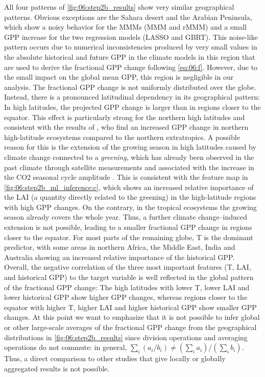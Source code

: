 All four patterns of \cref{fig:06:step2b_results} show very similar
geographical patterns. Obvious exceptions are the Sahara desert and the Arabian
Peninsula, which show a noisy behavior for the \aclp{MMM} (\ac{MMM} and
r\acs{MMM}) and a small \ac{GPP} increase for the two regression models
(\ac{LASSO} and \ac{GBRT}). This noise-like pattern occurs due to numerical
inconsistencies produced by very small values in the absolute historical and
future \ac{GPP} in the climate models in this region that are used to derive
the fractional \ac{GPP} change following \cref{eq:06:f}. However, due to the
small impact on the global mean \ac{GPP}, this region is negligible in our
analysis. The fractional \ac{GPP} change is not uniformly distributed over the
globe. Instead, there is a pronounced latitudinal dependency in its
geographical pattern: In high latitudes, the projected \ac{GPP} change is
larger than in regions closer to the equator. This effect is particularly
strong for the northern high latitudes and consistent with the results of
\textcite{Wenzel2016}, who find an increased \ac{GPP} change in northern
high-latitude ecosystems compared to the northern extratropics. A possible
reason for this is the extension of the growing season in high latitudes caused
by climate change connected to a \emph{greening}, which has already been
observed in the past climate through satellite measurements
\autocite{Lucht2002, Myneni1997, Zhang2020} and associated with the increase in
the \ac{CO2} seasonal cycle amplitude \autocite{Forkel2016}. This is consistent
with the feature map in \cref{fig:06:step2b_ml_inference:c}, which shows an
increased relative importance of the \ac{LAI} (a quantity directly related to
the greening) in the high-latitude regions with high \ac{GPP} changes. On the
contrary, in the tropical ecosystems the growing season already covers the
whole year. Thus, a further climate change--induced extension is not possible,
leading to a smaller fractional \ac{GPP} change in regions closer to the
equator. For most parts of the remaining globe, \ac{T} is the dominant
predictor, with some areas in northern Africa, the Middle East, India and
Australia showing an increased relative importance of the historical \ac{GPP}.
Overall, the negative correlation of the three most important features (\ac{T},
\ac{LAI}, and historical \ac{GPP}) to the target variable is well reflected in
the global pattern of the fractional \ac{GPP} change: The high latitudes with
lower \ac{T}, lower \ac{LAI} and lower historical \ac{GPP} show higher \ac{GPP}
changes, whereas regions closer to the equator with higher \ac{T}, higher
\ac{LAI} and higher historical \ac{GPP} show smaller \ac{GPP} changes. At this
point we want to emphasize that it is not possible to infer global or other
large-scale averages of the fractional \ac{GPP} change from the geographical
distributions in \cref{fig:06:step2b_results} since division operations and
averaging operations do not commute: in general, $\sum_i \left( a_i / b_i
\right) \neq \left( \sum_i a_i \right) / \left( \sum_i b_i \right)$. Thus, a
direct comparison to other studies that give locally or globally aggregated
results is not possible.

